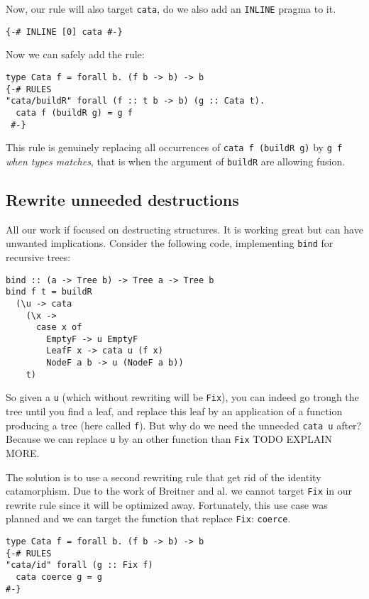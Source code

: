 \documentclass[format=sigplan]{acmart}
\newcommand{\minline}[1]{\texttt{#1}}
\begin{document}
Now, our rule will also target \minline{cata}, do we also add an \verb|INLINE| pragma to it.
\begin{verbatim}
{-# INLINE [0] cata #-}
\end{verbatim}

Now we can safely add the rule:
\begin{verbatim}
type Cata f = forall b. (f b -> b) -> b
{-# RULES
"cata/buildR" forall (f :: t b -> b) (g :: Cata t).
  cata f (buildR g) = g f
 #-}
\end{verbatim}
This rule is genuinely replacing all occurrences of \minline{cata f (buildR g)} by \minline{g f} \emph{when types matches}, that is when the argument of \minline{buildR} are allowing fusion.

\subsection{Rewrite unneeded destructions}
All our work if focused on destructing structures. It is working great but can have unwanted implications. Consider the following code, implementing \minline{bind} for recursive trees:

\begin{verbatim}
bind :: (a -> Tree b) -> Tree a -> Tree b
bind f t = buildR
  (\u -> cata
    (\x ->
      case x of
        EmptyF -> u EmptyF
        LeafF x -> cata u (f x)
        NodeF a b -> u (NodeF a b))
    t)
\end{verbatim}

So given a \minline{u} (which without rewriting will be \minline{Fix}), you can indeed go trough the tree until you find a leaf, and replace this leaf by an application of a function producing a tree (here called \minline{f}). But why do we need the unneeded \minline{cata u} after? Because we can replace \minline{u} by an other function than \minline{Fix} TODO EXPLAIN MORE.

The solution is to use a second rewriting rule that get rid of the identity catamorphism. Due to the work of Breitner and al. \cite{Breitner:2014:SZC:2692915.2628141} we cannot target \minline{Fix} in our rewrite rule since it will be optimized away. Fortunately, this use case was planned and we can target the function that replace \minline{Fix}: \minline{coerce}.

\begin{verbatim}
type Cata f = forall b. (f b -> b) -> b
{-# RULES
"cata/id" forall (g :: Fix f)
  cata coerce g = g
#-}
\end{verbatim}
\end{document}

